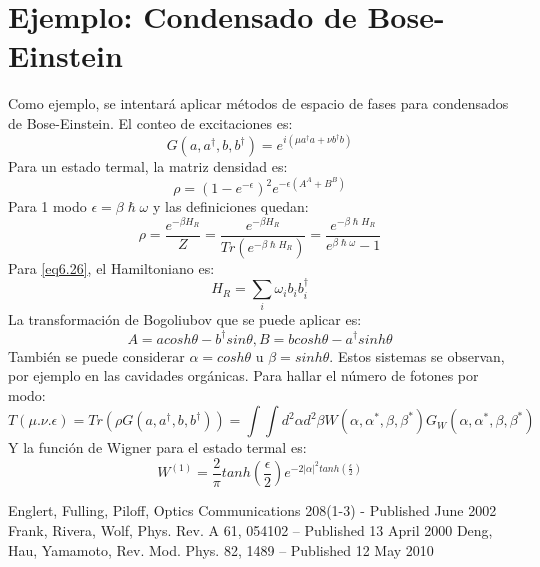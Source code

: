 \documentclass{book}
\begin{document}
\section{Ejemplo: Condensado de Bose-Einstein}
Como ejemplo, se intentará aplicar métodos de espacio de fases para condensados de Bose-Einstein. El conteo de excitaciones es:
\begin{equation}\label{eq6.24}G(a,a^\dag,b,b^\dag)=e^{i(\mu a^\dag a +\nu b^\dag b)}\end{equation}
Para un estado termal, la matriz densidad es:
\begin{equation}\label{eq6.25}\rho=(1-e^{-\epsilon})^2 e^{-\epsilon(A^A +B^B)}\end{equation}
Para 1 modo $\epsilon=\beta\hslash\omega$ y las definiciones quedan:
\begin{equation}\label{eq6.26}\rho=\frac{e^{-\beta H_R}}{Z}=\frac{e^{-\beta H_R}}{Tr(e^{-\beta\hslash H_R})}=\frac{e^{-\beta\hslash H_R}}{e^{\beta\hslash\omega}-1}\end{equation}
Para \ref{eq6.26}, el Hamiltoniano es:
\begin{equation}\label{eq6.27}H_R=\sum_i \omega_i b_ib_i^\dag\end{equation}
La transformación de Bogoliubov que se puede aplicar es:
\begin{equation}\label{eq6.28}A=acosh\theta-b^\dag sin\theta, B=bcosh\theta-a^\dag sinh\theta\end{equation}
También se puede considerar $\alpha=cosh\theta$ u $\beta=sinh\theta$. Estos sistemas se observan, por ejemplo en las cavidades orgánicas. Para hallar el número de fotones por modo:
\begin{equation}\label{eq6.29}T(\mu.\nu.\epsilon)=Tr(\rho G(a,a^\dag,b,b^\dag))=\int\int d^2\alpha d^2 \beta W(\alpha,\alpha^*,\beta,\beta^*)G_W(\alpha,\alpha^*,\beta,\beta^*)\end{equation}
Y la función de Wigner para el estado termal es:
\begin{equation}\label{eq6.30}W^{(1)}=\frac{2}{\pi}tanh(\frac{\epsilon}{2})e^{-2\lvert\alpha\rvert^2 tanh(\frac{\epsilon}{2})}\end{equation}

\begin{thebibliography}{9}
 Englert, Fulling, Piloff, Optics Communications 208(1-3) - Published June 2002
 Frank, Rivera, Wolf, Phys. Rev. A 61, 054102 – Published 13 April 2000
 Deng, Hau, Yamamoto, Rev. Mod. Phys. 82, 1489 – Published 12 May 2010
\end{thebibliography}
\end{document}
